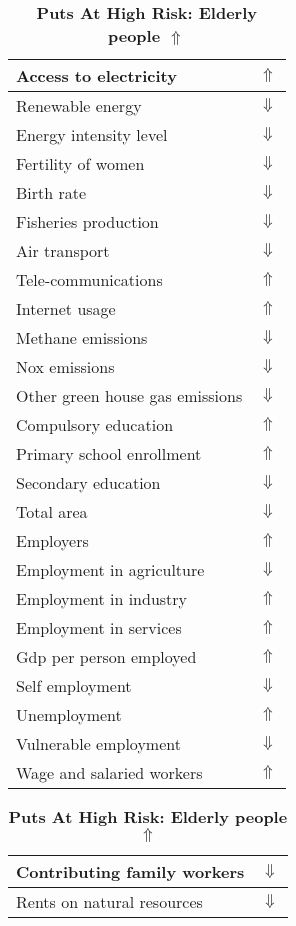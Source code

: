 \documentclass[12pt,notitlepage,oneside]{report}
\begin{document}
\begin{table}[!htb]
\caption{\textbf{Puts At High Risk: Elderly people $\Uparrow$}}
\centering
\label{Correlated Socio-economic Factors0}
\begin{tabular}{|l|l|}
\hline
Access to electricity & $\Uparrow$\\ \hline
Renewable energy & $\Downarrow$\\ \hline
Energy intensity level & $\Downarrow$\\ \hline
Fertility of women & $\Downarrow$\\ \hline
Birth rate & $\Downarrow$\\ \hline
Fisheries production & $\Downarrow$\\ \hline
Air transport  & $\Downarrow$\\ \hline
Tele-communications & $\Uparrow$\\ \hline
Internet usage & $\Uparrow$\\ \hline
Methane emissions & $\Downarrow$\\ \hline
Nox emissions & $\Downarrow$\\ \hline
Other green house gas emissions & $\Downarrow$\\ \hline
Compulsory education & $\Uparrow$\\ \hline
Primary school enrollment & $\Uparrow$\\ \hline
Secondary education & $\Downarrow$\\ \hline
Total area & $\Downarrow$\\ \hline
Employers & $\Uparrow$\\ \hline
Employment in agriculture & $\Downarrow$\\ \hline
Employment in industry & $\Uparrow$\\ \hline
Employment in services & $\Uparrow$\\ \hline
Gdp per person employed & $\Uparrow$\\ \hline
Self employment & $\Downarrow$\\ \hline
Unemployment & $\Uparrow$\\ \hline
Vulnerable employment & $\Downarrow$\\ \hline
Wage and salaried workers & $\Uparrow$\\ \hline
\end{tabular}
\begin{tabular}{|l|l|}
\hline
Contributing family workers & $\Downarrow$\\ \hline
Rents on natural resources & $\Downarrow$\\ \hline

\end{tabular}
\end{table}
\end{document}

